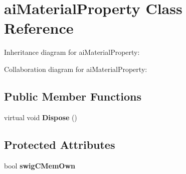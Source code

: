 \hypertarget{classai_material_property}{\section{ai\+Material\+Property Class Reference}
\label{classai_material_property}
}


Inheritance diagram for ai\+Material\+Property\+:


Collaboration diagram for ai\+Material\+Property\+:
\subsection*{Public Member Functions}
\begin{DoxyCompactItemize}
\item 
\hypertarget{classai_material_property_aa53a92e68e56434f435b0a56919e5a0e}{virtual void {\bfseries Dispose} ()}\label{classai_material_property_aa53a92e68e56434f435b0a56919e5a0e}

\end{DoxyCompactItemize}
\subsection*{Protected Attributes}
\begin{DoxyCompactItemize}
\item 
\hypertarget{classai_material_property_a56297c2ccbfc78f76f84d6ba67f08397}{bool {\bfseries swig\+C\+Mem\+Own}}\label{classai_material_property_a56297c2ccbfc78f76f84d6ba67f08397}

\end{DoxyCompactItemize}
